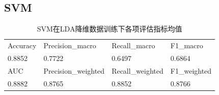 \documentclass[10pt]{article}
\begin{document}
\subsection{SVM}
\begin{table}[H]
  \centering
  \caption{SVM在LDA降维数据训练下各项评估指标均值}
  \begin{tabular}{llll}
  \toprule
  Accuracy & Precision\_macro & Recall\_macro & F1\_macro \\
  0.8852 & 0.7722 & 0.6497 & 0.6864 \\
  \midrule
  AUC & Precision\_weighted & Recall\_weighted & F1\_weighted \\
  0.8882 & 0.8765 & 0.8852 & 0.8766 \\
  \bottomrule
  \end{tabular}
\end{table}
\end{document}
